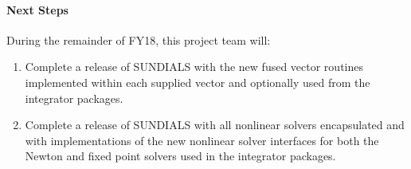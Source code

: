 \paragraph{Next Steps}

During the remainder of FY18, this project team will:
\begin{enumerate}
\item Complete a release of SUNDIALS with the new fused vector routines implemented within each supplied vector and optionally used from the integrator packages.
\item Complete a release of SUNDIALS with all nonlinear solvers encapsulated and with implementations of the new nonlinear solver interfaces for both the Newton and fixed point solvers used in the integrator packages.
\end{enumerate}
